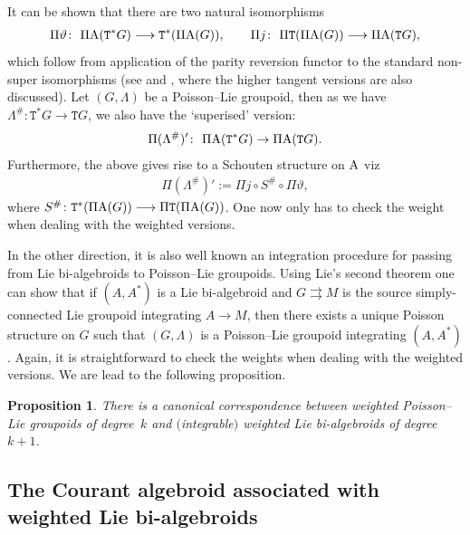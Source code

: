 \documentclass[10pt,a4paper]{amsart}
\def\sT{{\mathtt T}}
\numberwithin{equation}{section}
\newtheorem{Proposition}[Theorem]{Proposition}
 { \theoremstyle{definition}
\newtheorem{Definition}[Theorem]{Definition}
\newtheorem{Example}[Theorem]{Example}
\newtheorem{Remark}[Theorem]{Remark} }
\begin{document}
It can be shown that there are two natural isomorphisms
\begin{gather*}
 \Pi \vartheta \colon \  \Pi \textnormal{A}(\sT^{*}G)  \longrightarrow \sT^{*}(\Pi \textnormal{A}(G)), \qquad
 \Pi j \colon \ \Pi \sT (\Pi\textnormal{A}(G))  \longrightarrow  \Pi \textnormal{A}(\sT G),
\end{gather*}
 which follow from application of the parity reversion functor to the standard non-super isomorphisms (see \cite{Mackenzie2005, Mackenzie:2000} and \cite{KouotchopWamba:2013}, where the higher tangent versions are also discussed).  Let $(G, \Lambda)$ be a Poisson--Lie groupoid, then as we have  $\Lambda^{\#}\colon  \sT^{*}G \rightarrow \sT G$, we also have  the `superised' version:
\begin{gather*}
\Pi ( \Lambda^{\#})' \colon \ \Pi \textnormal{A}(\sT^{*}G) \rightarrow \Pi \textnormal{A}(\sT G).
\end{gather*}
Furthermore, the above gives  rise to a Schouten structure on $\textnormal{A}$ viz
\begin{gather*}
\Pi (\Lambda^{\#})' := \Pi j \circ S^{\#} \circ \Pi \vartheta,
\end{gather*}
where $S^{\#}\colon \sT^{*} (\Pi \textnormal{A}(G)) \longrightarrow \Pi \sT(\Pi \textnormal{A}(G))$. One now only has to check the weight when dealing with the weighted versions.

 In the other direction, it is also well known an integration procedure for passing from  Lie bi-algebroids to Poisson--Lie groupoids.  Using Lie's second theorem one can show that if $(A, A^{*})$ is a Lie bi-algebroid  and $G \rightrightarrows M$ is the source simply-connected Lie groupoid integrating $A \rightarrow M$, then there exists a unique Poisson structure on $G$ such that $(G,\Lambda)$ is a Poisson--Lie groupoid integrating $(A, A^{*})$. Again, it is straightforward to check the weights when dealing with the weighted versions. We are lead to the following proposition.
\begin{Proposition}
There is a canonical correspondence between weighted Poisson--Lie groupoids of degree~$k$ and
$($integrable$)$ weighted Lie bi-algebroids of degree~$k+1$.
\end{Proposition}


\subsection{The Courant algebroid associated with weighted Lie bi-algebroids}
\end{document}
